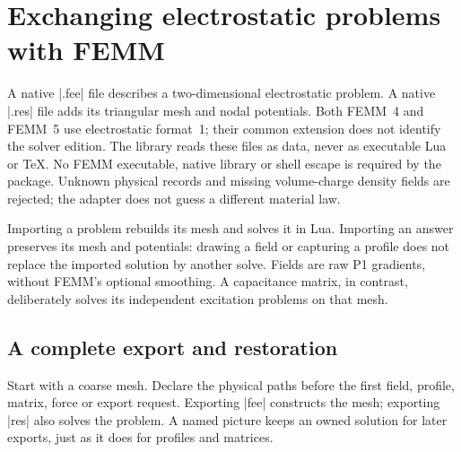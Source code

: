 \section{Exchanging electrostatic problems with FEMM}
\label{sec:electric-exchange}

A native |.fee| file describes a two-dimensional electrostatic problem. A native
|.res| file adds its triangular mesh and nodal potentials. Both FEMM~4 and FEMM~5
use electrostatic format~1; their common extension does not identify the solver
edition. The library reads these files as data, never as executable Lua or TeX.
No FEMM executable, native library or shell escape is required by the package.
Unknown physical records and missing volume-charge density fields are rejected;
the adapter does not guess a different material law.

Importing a problem rebuilds its mesh and solves it in Lua. Importing an answer
preserves its mesh and potentials: drawing a field or capturing a profile does
not replace the imported solution by another solve. Fields are raw P1 gradients,
without FEMM's optional smoothing. A capacitance matrix, in contrast, deliberately
solves its independent excitation problems on that mesh.

\subsection{A complete export and restoration}
Start with a coarse mesh. Declare the physical paths before the first field,
profile, matrix, force or export request. Exporting |fee| constructs the mesh;
exporting |res| also solves the problem. A named picture keeps an owned solution
for later exports, just as it does for profiles and matrices.

\Needspace{12cm}
\begin{codeexample}[width=0pt]
\femmelectricexport[model=exchange cell,
 file=\jobname-electric.fee,edition=femm5]
\femmelectricexport[model=exchange cell,
 file=\jobname-electric.res,format=res,edition=femm5]
\end{codeexample}

